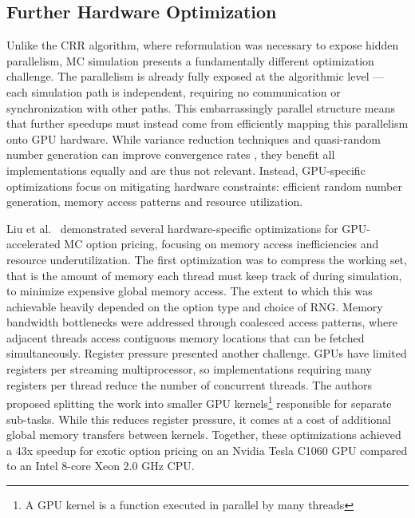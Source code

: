 \documentclass[english,12pt,a4paper,pdftex,sci,utf8]{aaltothesis}
\begin{document}
\subsection{Further Hardware Optimization}
Unlike the CRR algorithm, where reformulation was necessary to expose hidden parallelism, MC simulation presents a fundamentally different optimization challenge. The parallelism is already fully exposed at the algorithmic level --- each simulation path is independent, requiring no communication or synchronization with other paths. This embarrassingly parallel structure means that further speedups must instead come from efficiently mapping this parallelism onto GPU hardware. While variance reduction techniques and quasi-random number generation can improve convergence rates \cite{clewlow1998implementing}, they benefit all implementations equally and are thus not relevant. Instead, GPU-specific optimizations focus on mitigating hardware constraints: efficient random number generation, memory access patterns and resource utilization. 

Liu et al.\ \cite{liu2010efficient} demonstrated several hardware-specific optimizations for GPU-accelerated MC option pricing, focusing on memory access inefficiencies and resource underutilization. The first optimization was to compress the working set, that is the amount of memory each thread must keep track of during simulation, to minimize expensive global memory access. The extent to which this was achievable heavily depended on the option type and choice of RNG. Memory bandwidth bottlenecks were addressed through coalesced access patterns, where adjacent threads access contiguous memory locations that can be fetched simultaneously. Register pressure presented another challenge. GPUs have limited registers per streaming multiprocessor, so implementations requiring many registers per thread reduce the number of concurrent threads. The authors proposed splitting the work into smaller GPU kernels\footnote{A GPU kernel is a function executed in parallel by many threads} responsible for separate sub-tasks. While this reduces register pressure, it comes at a cost of additional global memory transfers between kernels. Together, these optimizations achieved a 43x speedup for exotic option pricing on an Nvidia Tesla C1060 GPU compared to an Intel 8-core Xeon 2.0 GHz CPU.
\end{document}
